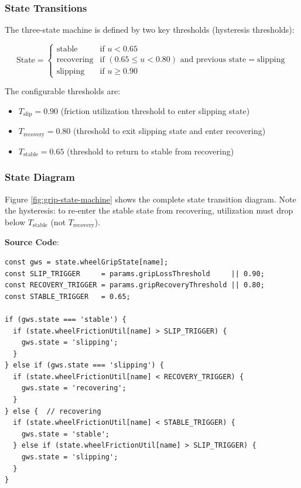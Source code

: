 \subsubsection*{State Transitions}

The three-state machine is defined by two key thresholds (hysteresis thresholds):

\begin{equation}
  \text{State} = \begin{cases}
    \text{stable}    & \text{if } u < 0.65 \\
    \text{recovering} & \text{if } (0.65 \le u < 0.80) \text{ and previous state} = \text{slipping} \\
    \text{slipping}  & \text{if } u \ge 0.90
  \end{cases}
  \label{eq:grip-state-transitions}
\end{equation}

The configurable thresholds are:
\begin{itemize}
  \item $T_{\text{slip}} = 0.90$ (friction utilization threshold to enter slipping state)
  \item $T_{\text{recovery}} = 0.80$ (threshold to exit slipping state and enter recovering)
  \item $T_{\text{stable}} = 0.65$ (threshold to return to stable from recovering)
\end{itemize}

\subsubsection*{State Diagram}

Figure \ref{fig:grip-state-machine} shows the complete state transition diagram. Note the hysteresis: to re-enter the stable state from recovering, utilization must drop below $T_{\text{stable}}$ (not $T_{\text{recovery}}$).

\textbf{Source Code}: 

\begin{lstlisting}[caption={Grip state machine implementation}]
const gws = state.wheelGripState[name];
const SLIP_TRIGGER     = params.gripLossThreshold     || 0.90;
const RECOVERY_TRIGGER = params.gripRecoveryThreshold || 0.80;
const STABLE_TRIGGER   = 0.65;

if (gws.state === 'stable') {
  if (state.wheelFrictionUtil[name] > SLIP_TRIGGER) {
    gws.state = 'slipping';
  }
} else if (gws.state === 'slipping') {
  if (state.wheelFrictionUtil[name] < RECOVERY_TRIGGER) {
    gws.state = 'recovering';
  }
} else {  // recovering
  if (state.wheelFrictionUtil[name] < STABLE_TRIGGER) {
    gws.state = 'stable';
  } else if (state.wheelFrictionUtil[name] > SLIP_TRIGGER) {
    gws.state = 'slipping';
  }
}
\end{lstlisting}

